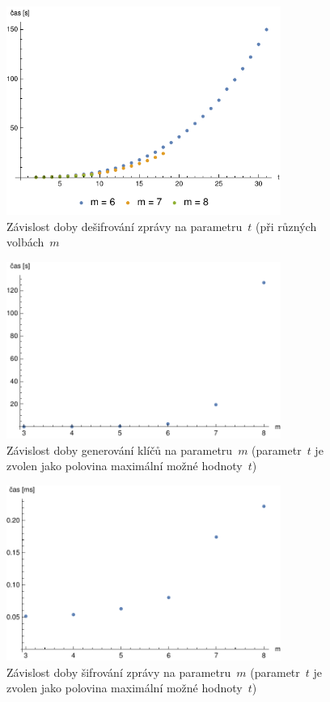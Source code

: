 \documentclass[thesis=M,czech,hidelinks]{FITthesis}[2012/06/26]
\newcommand{\0}{{\textcolor[gray]{0.75}{0}}}
\begin{document}
\begin{figure}[!ht]
    \centering
    \includegraphics[width=0.8\textwidth]{../implementace/grafy/listplot_m6-8_desifrovani.pdf}
    \caption{
        Závislost doby dešifrování zprávy na parametru~$t$ (při různých
        volbách~$m$
    }
    \label{obr_mereni_t_desifr}
\end{figure}

\begin{figure}[!ht]
    \centering
    \includegraphics[width=0.8\textwidth]{../implementace/grafy/listplot_tPul_generovani.pdf}
    \caption{
        Závislost doby generování klíčů na parametru~$m$ (parametr~$t$ je
        zvolen jako polovina maximální možné hodnoty~$t$)
    }
    \label{obr_mereni_m_gen}
\end{figure}

\begin{figure}[!ht]
    \centering
    \includegraphics[width=0.8\textwidth]{../implementace/grafy/listplot_tPul_sifrovani.pdf}
    \caption{
        Závislost doby šifrování zprávy na parametru~$m$ (parametr~$t$ je zvolen
        jako polovina maximální možné hodnoty~$t$)
    }
    \label{obr_mereni_m_sifr}
\end{figure}
\end{document}
